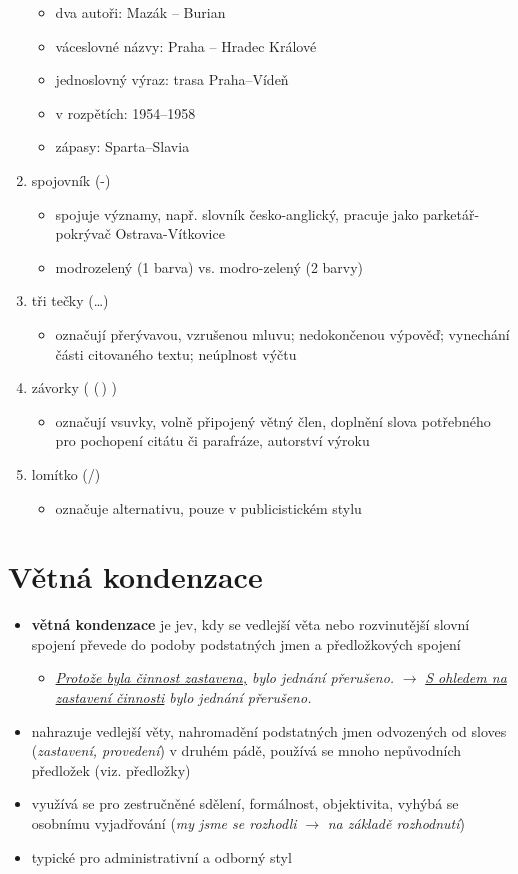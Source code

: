 \documentclass{memoir}
\begin{document}
\begin{enumerate}
\begin{itemize}
			\item dva autoři: Mazák -- Burian
			\item váceslovné názvy: Praha -- Hradec Králové
			\item jednoslovný výraz: trasa Praha--Vídeň
			\item v rozpětích: 1954--1958
			\item zápasy: Sparta--Slavia
		\end{itemize}
		\item spojovník (-)
		\begin{itemize}
		\item spojuje významy, např. slovník česko-anglický, pracuje jako parketář-pokrývač
		Ostrava-Vítkovice
		\item modrozelený (1 barva) vs. modro-zelený (2 barvy)
		\end{itemize}
		\item tři tečky (\dots)
		\begin{itemize}
			\item označují přerývavou, vzrušenou mluvu; nedokončenou výpověď; vynechání části citovaného textu; neúplnost výčtu
		\end{itemize}
		\item závorky ( (\,) )
		\begin{itemize}
			\item označují vsuvky, volně připojený větný člen, doplnění slova potřebného pro pochopení citátu či parafráze, autorství výroku
		\end{itemize}
		\item lomítko (/)
		\begin{itemize}
			\item označuje alternativu, pouze v publicistickém stylu
		\end{itemize}
	\end{enumerate}

\section*{Větná kondenzace}
	\begin{itemize}
		\item \textbf{větná kondenzace} je jev, kdy se vedlejší věta nebo rozvinutější slovní spojení převede do podoby podstatných jmen a předložkových spojení
		\begin{itemize}
			\item \textit{\underline{Protože byla činnost zastavena,} bylo jednání přerušeno.} $\rightarrow$ \textit{\underline{S ohledem na zastavení činnosti} bylo jednání přerušeno.}
		\end{itemize}
		\item nahrazuje vedlejší věty, nahromadění podstatných jmen odvozených od sloves (\textit{zastavení, provedení}) v druhém pádě, používá se mnoho nepůvodních předložek (viz. předložky)
		\item využívá se pro zestručněné sdělení, formálnost, objektivita, vyhýbá se osobnímu vyjadřování (\textit{my jsme se rozhodli} $\rightarrow$ \textit{na základě rozhodnutí})
		\item typické pro administrativní a odborný styl
	\end{itemize}
\end{document}
